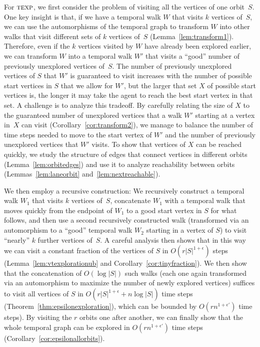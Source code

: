 \documentclass[10pt,a4paper]{article}
\newcommand{\texp}{\textsc{texp}}
\begin{document}
For $\texp$, we first consider the problem of visiting all the vertices of one
orbit~$S$. One key insight is that, if we have a temporal walk $W$ that visits
$k$ vertices of~$S$, we can use the automorphisms of the temporal graph to
transform $W$ into other walks that visit different sets of $k$ vertices of~$S$
(Lemma~\ref{lem:transform1}).
Therefore, even if the $k$ vertices visited by $W$ have already been explored
earlier, we can transform $W$ into a temporal walk $W'$ that visits a ``good''
number of previously unexplored vertices of~$S$. The number of previously
unexplored vertices of $S$ that $W'$ is guaranteed to visit increases with the
number of possible start vertices in $S$ that we allow for $W'$, but the larger
that set $X$ of possible start vertices is, the longer it may take the agent to
reach the best start vertex in that set. A challenge is to analyze this
tradeoff. By carefully relating the size of $X$ to the guaranteed number of
unexplored vertices that a walk $W'$ starting at a vertex in~$X$ can visit
(Corollary~\ref{cor:transform2}), we
manage to balance the number of time steps needed to move to the start vertex of
$W'$ and the number of previously unexplored vertices that $W'$ visits.
To show that vertices of $X$ can be reached quickly, we study the structure
of edges that connect vertices in different orbits (Lemma~\ref{lem:orbitedges})
and use it to analyze
reachability between orbits (Lemmas~\ref{lem:laneorbit} and~\ref{lem:nextreachable}).

We then employ a recursive construction: We recursively construct a temporal
walk {$W_{1}$ that} visits $k$ vertices of~$S$, concatenate
$W_{1}$ with a temporal walk that moves quickly from the endpoint of
$W_{1}$ to a good start vertex in $S$ for what follows, and then use a second recursively constructed walk
(transformed via an automorphism to a ``good'' temporal walk
{$W_{2}$} starting in a vertex of $S$) to visit ``nearly'' $k$
further vertices of~$S$. {A careful} analysis then shows that in this way
we can visit a constant fraction of the vertices of $S$ in
$O(r|S|^{1+\epsilon})$ steps (Lemma~\ref{lem:vtexplorationub} and Corollary~\ref{cor:tinyfraction}).
We then show that the concatenation of $O(\log
|S|)$ such walks (each one again transformed via an automorphism to maximize the
number of newly explored vertices) suffices to visit all vertices of $S$ in
$O(r|S|^{1+\epsilon}+n\log |S|)$ time steps (Theorem~\ref{thm:epsilonexploration}),
which can be bounded by $O(r
n^{1+\epsilon'})$ time steps). By visiting the $r$ orbits one after another, we
can finally show that the whole temporal graph can be explored in
$O(r n^{1+\epsilon'})$ time steps (Corollary~\ref{cor:epsilonallorbits}).
\end{document}
